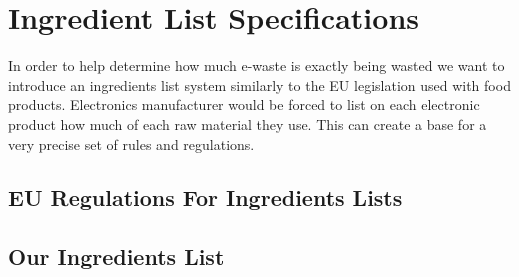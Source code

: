 \section{Ingredient List Specifications} %

In order to help determine how much e-waste is exactly being wasted we want to introduce an ingredients list system similarly to the EU legislation used with food products\cite{eu-ingredients-bmel}. Electronics manufacturer would be forced to list on each electronic product how much of each raw material they use. This can create a base for a very precise set of rules and regulations.

\subsection{EU Regulations For Ingredients Lists}



\subsection{Our Ingredients List}